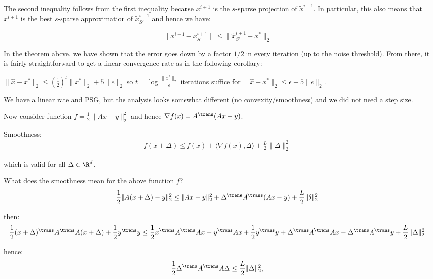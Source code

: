 The second inequality follows from the first inequality because $x^{i+1}$ is the $s$-sparse projection of $\tilde x^{i+1}$. In particular, this also means that $x^{i+1}$ is the best $s$-sparse approximation of $\tilde x_{S\prime}^{i+1}$ and hence we have:

$$\| x^{i+1} - x_{S\prime }^{i+1} \| \leq \| \tilde x_{S\prime}^{i+1} -x^*\|_2$$ 

In the theorem above, we have shown that the error goes down by a factor $1/2$ in every iteration (up to the noise threshold). From there, it is fairly straightforward to get a linear convergence rate as in the following corollary:
\begin{corollary}
$\| \hat x - x^*\|_2 \leq (\frac{1}{2})^t \|x^* \|_2 + 5\|e\|_2$
so $t = \log \frac{\| x^*\|_2}{\epsilon}$ iterations suffice for $\| \hat x - x^*\|_2 \leq \epsilon + 5\|e\|_2$.
\end{corollary}
 We have a linear rate and PSG, but the analysis looks somewhat different (no convexity/smoothness) and we did not need a step size.
 
Now consider function $f =  \frac{1}{2}\|Ax-y \|_2^2$ and hence $\nabla f(x) = A^{\trans}(Ax-y)$.

\begin{definition}
Smoothness:
\begin{align*}
f(x+\Delta) \leq f(x) + \langle \nabla f(x), \Delta \rangle + \frac{L}{2} \| \Delta\|_2^2 
\end{align*}

which is valid for all $\Delta \in \R^d$.
\end{definition}

What does the smoothness mean for the above function $f$?
\begin{align*}
\frac{1}{2}\|A(x+\Delta) - y\|_2^2 \leq \|Ax-y\|_2^2 + \Delta^{\trans} A^{\trans}(Ax-y) + \frac{L}{2}\|\delta\|_2^2
\end{align*}

then:
\begin{align*}
\frac{1}{2}(x+\Delta)^{\trans} A^{\trans}A(x+\Delta) + \frac{1}{2}y^{\trans} y \leq \frac{1}{2} x^{\trans} A^{\trans} Ax-y^{\trans} Ax + \frac{1}{2}y^{\trans} y + \Delta^{\trans} A^{\trans} Ax- \Delta^{\trans} A^{\trans} y + \frac{L}{2} \|\Delta\|_2^2 \end{align*}

hence:
\begin{align*}
\frac{1}{2}\Delta^{\trans} A^{\trans} A \Delta \leq \frac{L}{2}\|\Delta\|_2^2,
\end{align*}


